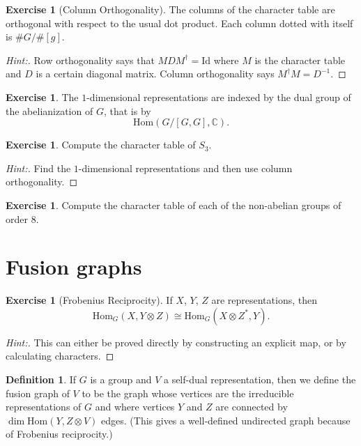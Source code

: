 \documentclass[11pt]{article}
\theoremstyle{plain}
\theoremstyle{definition}
\newtheorem{definition}[proposition]{Definition}
\newtheorem{exercise}[proposition]{Exercise}
\theoremstyle{remark}
\begin{document}
\begin{exercise}[Column Orthogonality]
The columns of the character table are orthogonal with respect to the usual dot product.  Each column dotted with itself is $\#G/\#[g]$.
\end{exercise}
\begin{proof}[Hint:]
Row orthogonality says that $M D M^\dagger = \mathrm{Id}$ where $M$ is the character table and $D$ is a certain diagonal matrix.  Column orthogonality says $M^\dagger M = D^{-1}$.
\end{proof}

\begin{exercise}
The $1$-dimensional representations are indexed by the dual group of the abelianization of $G$, that is by 
$$\mathrm{Hom}(G/[G,G],\mathbb{C}).$$
\end{exercise}

\begin{exercise}
Compute the character table of $S_3$.
\end{exercise}
\begin{proof}[Hint:]
Find the $1$-dimensional representations and then use column orthogonality.
\end{proof}

\begin{exercise}
Compute the character table of each of the non-abelian groups of order $8$.
\end{exercise}

\section{Fusion graphs}

\begin{exercise}[Frobenius Reciprocity]
If $X$, $Y$, $Z$ are representations, then
$$\mathrm{Hom}_G(X, Y \otimes Z) \cong \mathrm{Hom}_G(X \otimes Z^*, Y).$$
\end{exercise}
\begin{proof}[Hint:]
This can either be proved directly by constructing an explicit map, or by calculating characters.
\end{proof}


\begin{definition}
If $G$ is a group and $V$ a self-dual representation, then we define the fusion graph of $V$ to be the graph whose vertices are the irreducible representations of $G$ and where vertices $Y$ and $Z$ are connected by $\dim \mathrm{Hom}(Y,Z\otimes V)$ edges.  (This gives a well-defined undirected graph because of Frobenius reciprocity.)
\end{definition}
\end{document}
